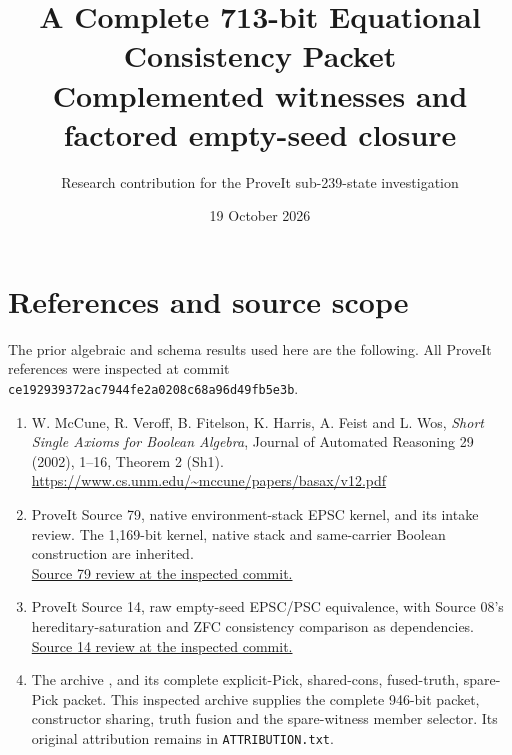 \documentclass[11pt]{article}
\title{A Complete 713-bit Equational Consistency Packet\\
\large Complemented witnesses and factored empty-seed closure}
\author{Research contribution for the ProveIt sub-239-state investigation}
\date{19 October 2026}
\begin{document}
\maketitle

\section*{References and source scope}
The prior algebraic and schema results used here are the following.
All ProveIt references were inspected at commit
\texttt{ce192939372ac7944fe2a0208c68a96d49fb5e3b}.
\begin{enumerate}
\item W. McCune, R. Veroff, B. Fitelson, K. Harris, A. Feist and L. Wos,
\emph{Short Single Axioms for Boolean Algebra}, Journal of Automated
Reasoning 29 (2002), 1--16, Theorem 2 (Sh1).\\
\url{https://www.cs.unm.edu/~mccune/papers/basax/v12.pdf}
\item ProveIt Source 79, native environment-stack EPSC kernel, and its
intake review. The 1,169-bit kernel, native stack and same-carrier Boolean
construction are inherited.\\
\href{https://github.com/VladimirReshetnikov/ProveIt/blob/ce192939372ac7944fe2a0208c68a96d49fb5e3b/SetTheory/Cardinals/docs/reports/set-theory/zfc-closure-kernels/intake-169-source-79.md}{Source 79 review at the inspected commit.}
\item ProveIt Source 14, raw empty-seed EPSC/PSC equivalence, with Source
08's hereditary-saturation and ZFC consistency comparison as dependencies.\\
\href{https://github.com/VladimirReshetnikov/ProveIt/blob/ce192939372ac7944fe2a0208c68a96d49fb5e3b/SetTheory/Cardinals/docs/reports/set-theory/zfc-closure-kernels/intake-146-source-14.md}{Source 14 review at the inspected commit.}
\item The archive ,
 and its complete explicit-Pick,
shared-cons, fused-truth, spare-Pick packet.
This inspected archive supplies the complete 946-bit packet, constructor
sharing, truth fusion and the spare-witness member selector. Its original
attribution remains in \texttt{ATTRIBUTION.txt}.
\end{enumerate}
\end{document}
